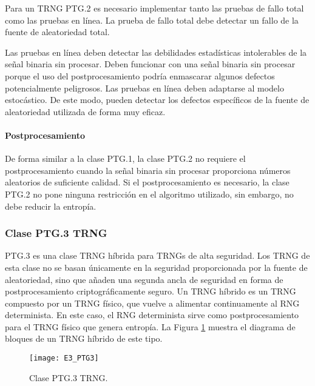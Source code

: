                 Para un TRNG PTG.2 es necesario implementar tanto las pruebas de fallo total como las pruebas en línea. La prueba de fallo total debe detectar un fallo de la fuente de aleatoriedad total.

                Las pruebas en línea deben detectar las debilidades estadísticas intolerables de la señal binaria sin procesar. Deben funcionar con una señal binaria sin procesar porque el uso del postprocesamiento podría enmascarar algunos defectos potencialmente peligrosos. Las pruebas en línea deben adaptarse al modelo estocástico. De este modo, pueden detectar los defectos específicos de la fuente de aleatoriedad utilizada de forma muy eficaz.

                \paragraph{Postprocesamiento\\}
                
                De forma similar a la clase PTG.1, la clase PTG.2 no requiere el postprocesamiento cuando la señal binaria sin procesar proporciona números aleatorios de suficiente calidad. Si el postprocesamiento es necesario, la clase PTG.2 no pone ninguna restricción en el algoritmo utilizado, sin embargo, no debe reducir la entropía.

            \subsubsection{Clase PTG.3 TRNG}
            
                PTG.3 es una clase TRNG híbrida para TRNGs de alta seguridad. Los TRNG de esta clase no se basan únicamente en la seguridad proporcionada por la fuente de aleatoriedad, sino que añaden una segunda ancla de seguridad en forma de postprocesamiento criptográficamente seguro. Un TRNG híbrido es un TRNG compuesto por un TRNG físico, que vuelve a alimentar continuamente al RNG determinista. En este caso, el RNG determinista sirve como postprocesamiento para el TRNG físico que genera entropía. La Figura \ref{fig:E3_PTG3} muestra el diagrama de bloques de un TRNG híbrido de este tipo.

                \begin{figure}[hbtp]
                    \centering
                    \texttt{[image: E3\_PTG3]}
                    \caption{Clase PTG.3 TRNG.}
                    \label{fig:E3_PTG3}
                \end{figure}
            
